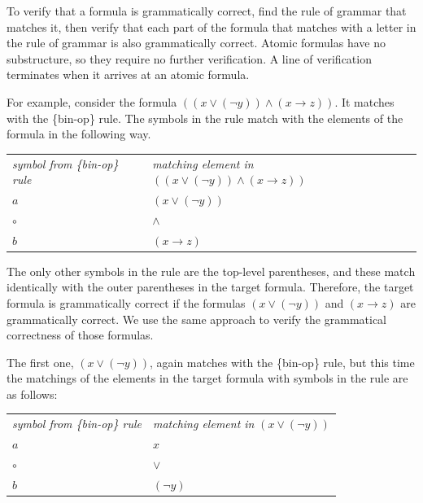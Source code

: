 To verify that a formula is grammatically correct, find the rule of grammar that matches it, then verify that each part of the formula that matches with a letter in the rule of grammar is also grammatically correct. Atomic formulas have no substructure, so they require no further verification. A line of verification terminates when it arrives at an atomic formula.

For example, consider the formula $((x \vee (\neg y)) \wedge (x \rightarrow z))$. It matches with the \{bin-op\} rule. The symbols in the rule match with the elements of the formula in the following way.
\begin{center}
\begin{tabular}{ll}
\emph{symbol from \{bin-op\} rule}      & \emph{matching element in} $((x \vee (\neg y)) \wedge (x \rightarrow z))$ \\
$a$                                     & $(x \vee (\neg y))$ \\
$\circ$                                 & $\wedge$ \\
$b$                                     & $(x \rightarrow z)$ \\
\end{tabular}
\end{center}

The only other symbols in the rule are the top-level parentheses, and these match identically with the outer parentheses in the target formula. Therefore, the target formula is grammatically correct if the formulas $(x \vee (\neg y))$ and $(x \rightarrow z)$  are grammatically correct. We use the same approach to verify the grammatical correctness of those formulas.

The first one, $(x \vee (\neg y))$, again matches with the \{bin-op\} rule, but this time the matchings of the elements in the target formula with symbols in the rule are as follows:
\begin{center}
\begin{tabular}{ll}
\emph{symbol from \{bin-op\} rule}      & \emph{matching element in}  $(x \vee (\neg y))$ \\
$a$                                     & $x$ \\
$\circ$                                 & $\vee$ \\
$b$                                     & $(\neg y)$ \\
\end{tabular}
\end{center}

